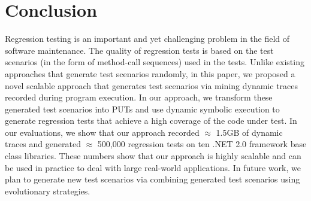 \section{Conclusion}
\label{sec:conclusion}

Regression testing is an important and yet challenging problem in the
field of software maintenance. The quality of regression tests is based on
the test scenarios (in the form of method-call sequences) used in the tests.
Unlike existing approaches that generate test scenarios randomly, in this paper,
we proposed a novel scalable approach that generates test scenarios via mining dynamic
traces recorded during program execution. In our approach, we transform these generated
test scenarios into PUTs and use dynamic symbolic execution to generate regression
tests that achieve a high coverage of the code under test. In our evaluations,
we show that our approach recorded $\approx$ 1.5GB of dynamic traces and 
generated $\approx$ 500,000 regression tests on ten .NET 2.0 framework base class libraries. 
These numbers show that our approach is highly scalable and can be used in practice to deal 
with large real-world applications. In future work, we plan to generate new test scenarios
via combining generated test scenarios using evolutionary strategies.